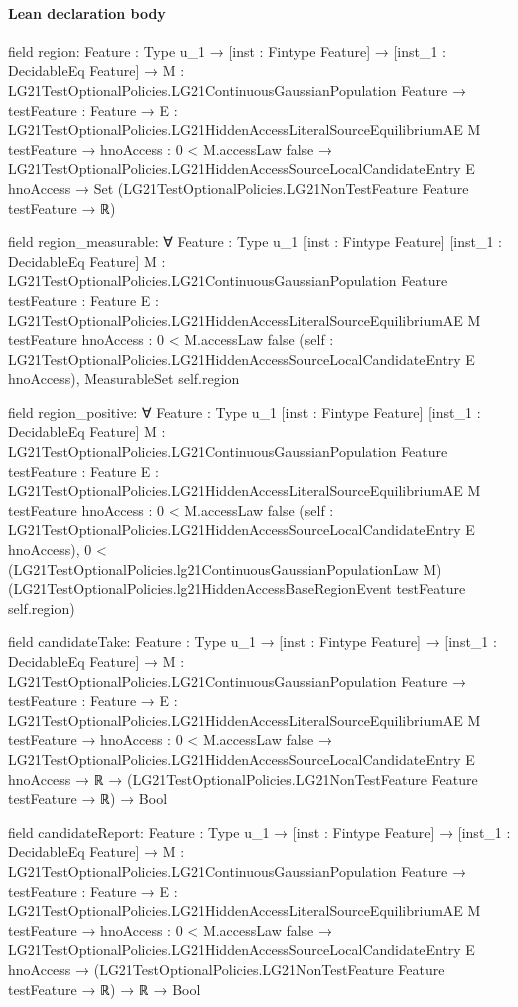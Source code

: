 \documentclass[10pt]{article}
\begin{document}
\paragraph{Lean declaration body}
\begin{ReviewVerbatim}
field region:
{Feature : Type u_1} →
  [inst : Fintype Feature] →
    [inst_1 : DecidableEq Feature] →
      {M : LG21TestOptionalPolicies.LG21ContinuousGaussianPopulation Feature} →
        {testFeature : Feature} →
          {E : LG21TestOptionalPolicies.LG21HiddenAccessLiteralSourceEquilibriumAE M testFeature} →
            {hnoAccess : 0 < M.accessLaw {false}} →
              LG21TestOptionalPolicies.LG21HiddenAccessSourceLocalCandidateEntry E hnoAccess →
                Set (LG21TestOptionalPolicies.LG21NonTestFeature Feature testFeature → ℝ)

field region_measurable:
∀ {Feature : Type u_1} [inst : Fintype Feature] [inst_1 : DecidableEq Feature]
  {M : LG21TestOptionalPolicies.LG21ContinuousGaussianPopulation Feature} {testFeature : Feature}
  {E : LG21TestOptionalPolicies.LG21HiddenAccessLiteralSourceEquilibriumAE M testFeature}
  {hnoAccess : 0 < M.accessLaw {false}}
  (self : LG21TestOptionalPolicies.LG21HiddenAccessSourceLocalCandidateEntry E hnoAccess), MeasurableSet self.region

field region_positive:
∀ {Feature : Type u_1} [inst : Fintype Feature] [inst_1 : DecidableEq Feature]
  {M : LG21TestOptionalPolicies.LG21ContinuousGaussianPopulation Feature} {testFeature : Feature}
  {E : LG21TestOptionalPolicies.LG21HiddenAccessLiteralSourceEquilibriumAE M testFeature}
  {hnoAccess : 0 < M.accessLaw {false}}
  (self : LG21TestOptionalPolicies.LG21HiddenAccessSourceLocalCandidateEntry E hnoAccess),
  0 <
    (LG21TestOptionalPolicies.lg21ContinuousGaussianPopulationLaw M)
      (LG21TestOptionalPolicies.lg21HiddenAccessBaseRegionEvent testFeature self.region)

field candidateTake:
{Feature : Type u_1} →
  [inst : Fintype Feature] →
    [inst_1 : DecidableEq Feature] →
      {M : LG21TestOptionalPolicies.LG21ContinuousGaussianPopulation Feature} →
        {testFeature : Feature} →
          {E : LG21TestOptionalPolicies.LG21HiddenAccessLiteralSourceEquilibriumAE M testFeature} →
            {hnoAccess : 0 < M.accessLaw {false}} →
              LG21TestOptionalPolicies.LG21HiddenAccessSourceLocalCandidateEntry E hnoAccess →
                ℝ → (LG21TestOptionalPolicies.LG21NonTestFeature Feature testFeature → ℝ) → Bool

field candidateReport:
{Feature : Type u_1} →
  [inst : Fintype Feature] →
    [inst_1 : DecidableEq Feature] →
      {M : LG21TestOptionalPolicies.LG21ContinuousGaussianPopulation Feature} →
        {testFeature : Feature} →
          {E : LG21TestOptionalPolicies.LG21HiddenAccessLiteralSourceEquilibriumAE M testFeature} →
            {hnoAccess : 0 < M.accessLaw {false}} →
              LG21TestOptionalPolicies.LG21HiddenAccessSourceLocalCandidateEntry E hnoAccess →
                (LG21TestOptionalPolicies.LG21NonTestFeature Feature testFeature → ℝ) → ℝ → Bool


\end{ReviewVerbatim}
\end{document}
